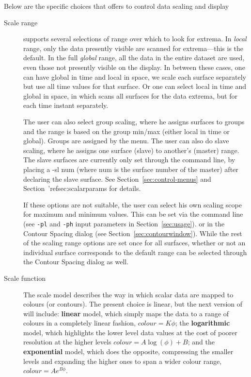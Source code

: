 Below are the specific choices that \map{} offers to control data scaling
and display
\begin{description}
  
  \item[Scale range] \map{} supports several selections of range over which
    to look for extrema.  In {\em local\/} range, only the data presently
    visible are scanned for extrema---this is the default.  In the full
    {\em global\/} range, all the data in the entire dataset are used, even
    those not presently visible on the display.  In between these cases,
    one can have global in time and local in space, \ie{} we scale each
    surface separately but use all time values for that surface.  Or one
    can select local in time and global in space, in which \map{} scans all
    surfaces for the data extrema, but for each time instant separately.  

    The user can also select group
    scaling, where he assigns surfaces to groups and the range is based on
    the group min/max (either local in time or global).  Groups are
    assigned by the menu.  The user can also do slave scaling, where he
    assigns one surface (slave) to another's (master) range.  The slave
    surfaces are currently only set through the command line, by placing a
    -sl num (where num is the surface number of the master) after declaring
    the slave surface.  See Section~\ref{sec:control-menus} and
    Section~'ref{sec:scalarparams} for details.

    If these options are not suitable, the user can select his own scaling 
    scope for
    maximum and minimum values. This can be set via the command line 
    (see {\tt -pl} and {\tt -ph} input parameters in Section~\ref{sec:usage}).
    or in the Contour Spacing dialog (see Section~\ref{sec:contourwindow}).
    While the rest of the scaling range options are set once for all 
    surfaces, whether or not an individual surface corresponds to the
    default range can be selected through the Contour Spacing dialog as well.

        
  \item[Scale function] The scale model describes the way in which scalar
    data are mapped to colours (or contours).  The present choice is
    linear, but the next version of \map{} will include: \textbf{linear}
    model, which simply maps the data to a range of colours in a completely
    linear fashion, \ie{} \mbox{$colour = K \phi$}; the
    \textbf{logarithmic} model, which highlights the lower level data
    values at the cost of poorer resolution at the higher levels \ie{}
    \mbox{$colour = A\log(\phi) + B$}; and the \textbf{exponential} model,
    which does the opposite, compressing the smaller levels and expanding
    the higher ones to span a wider colour range, \ie{} \mbox{$colour = A
      e^{B\phi}$}.
    

\end{description}
